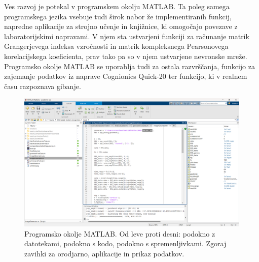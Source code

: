 \thispagestyle{fancy}
Ves razvoj je potekal v programskem okolju MATLAB. Ta poleg samega programskega jezika vsebuje tudi širok nabor že implementiranih funkcij, napredne aplikacije za strojno učenje in knjižnice, ki omogočajo povezave z laboratorijskimi napravami. V njem sta ustvarjeni funkciji za računanje matrik Grangerjevega indeksa vzročnosti in matrik kompleksnega Pearsonovega korelacijskega koeficienta, prav tako pa so v njem ustvarjene nevronske mreže. Programsko okolje MATLAB se uporablja tudi za ostala razvrščanja, funkcijo za zajemanje podatkov iz naprave Cognionics Quick-20 ter funkcijo, ki v realnem času razpoznava gibanje. \cite{MATLAB}
\begin{figure}[h!]
    \begin{center}
    \includegraphics[width=1\linewidth]{slike/Matlab.png}
    \end{center}
    \caption[Programsko okolje MATLAB.]{Programsko okolje MATLAB. Od leve proti desni: podokno z datotekami, podokno s kodo, podokno s spremenljivkami. Zgoraj zavihki za orodjarno, aplikacije in prikaz podatkov.}
    \end{figure}
    
